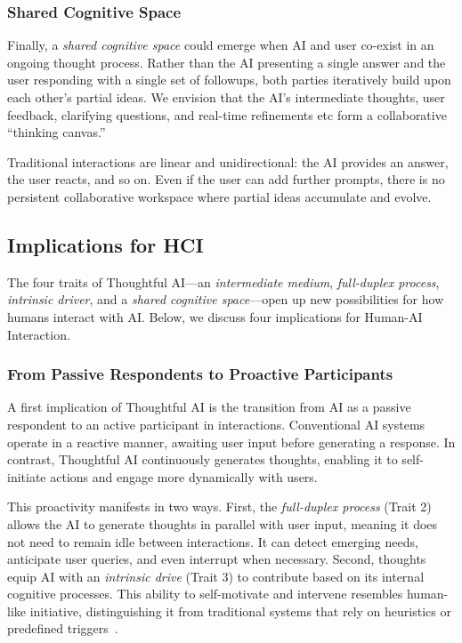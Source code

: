 \subsubsection{Shared Cognitive Space}

Finally, a \textit{shared cognitive space} could emerge when AI and user co-exist in an ongoing thought process. Rather than the AI presenting a single answer and the user responding with a single set of followups, both parties iteratively build upon each other’s partial ideas. We envision that the AI’s intermediate thoughts, user feedback, clarifying questions, and real-time refinements etc form a collaborative ``thinking canvas.''

Traditional interactions are linear and unidirectional: the AI provides an answer, the user reacts, and so on. Even if the user can add further prompts, there is no persistent collaborative workspace where partial ideas accumulate and evolve. 


\subsection{Implications for HCI}
The four traits of Thoughtful AI---an \textit{intermediate medium}, \textit{full-duplex process}, \textit{intrinsic driver}, and a \textit{shared cognitive space}---open up new possibilities for how humans interact with AI. Below, we discuss four implications for Human-AI Interaction.

\subsubsection{From Passive Respondents to Proactive Participants}
A first implication of Thoughtful AI is the transition from AI as a passive respondent to an active participant in interactions. Conventional AI systems operate in a reactive manner, awaiting user input before generating a response. In contrast, Thoughtful AI continuously generates thoughts, enabling it to self-initiate actions and engage more dynamically with users.

This proactivity manifests in two ways. First, the \textit{full-duplex process} (Trait 2) allows the AI to generate thoughts in parallel with user input, meaning it does not need to remain idle between interactions. It can detect emerging needs, anticipate user queries, and even interrupt when necessary. Second, thoughts equip AI with an \textit{intrinsic drive} (Trait 3) to contribute based on its internal cognitive processes. This ability to self-motivate and intervene resembles human-like initiative, distinguishing it from traditional systems that rely on heuristics or predefined triggers~\cite{horvitz1999principles}.


